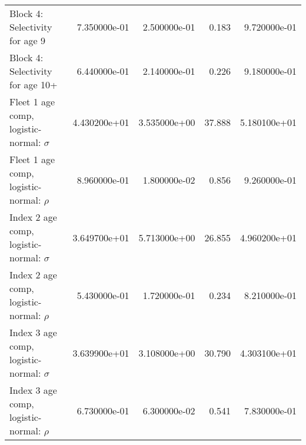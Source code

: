 \documentclass[
]{article}
\begin{document}
\begin{landscape}
\begin{longtable}[t]{lrrrr}
Block 4: Selectivity for age 9 & 7.350000e-01 & 2.500000e-01 & 0.183 & 9.720000e-01\\
Block 4: Selectivity for age 10+ & 6.440000e-01 & 2.140000e-01 & 0.226 & 9.180000e-01\\
Fleet 1 age comp, logistic-normal: $\sigma$ & 4.430200e+01 & 3.535000e+00 & 37.888 & 5.180100e+01\\
Fleet 1 age comp, logistic-normal: $\rho$ & 8.960000e-01 & 1.800000e-02 & 0.856 & 9.260000e-01\\
\addlinespace
Index 2 age comp, logistic-normal: $\sigma$ & 3.649700e+01 & 5.713000e+00 & 26.855 & 4.960200e+01\\
Index 2 age comp, logistic-normal: $\rho$ & 5.430000e-01 & 1.720000e-01 & 0.234 & 8.210000e-01\\
Index 3 age comp, logistic-normal: $\sigma$ & 3.639900e+01 & 3.108000e+00 & 30.790 & 4.303100e+01\\
Index 3 age comp, logistic-normal: $\rho$ & 6.730000e-01 & 6.300000e-02 & 0.541 & 7.830000e-01\\*
\end{longtable}
\end{landscape}
\end{document}
